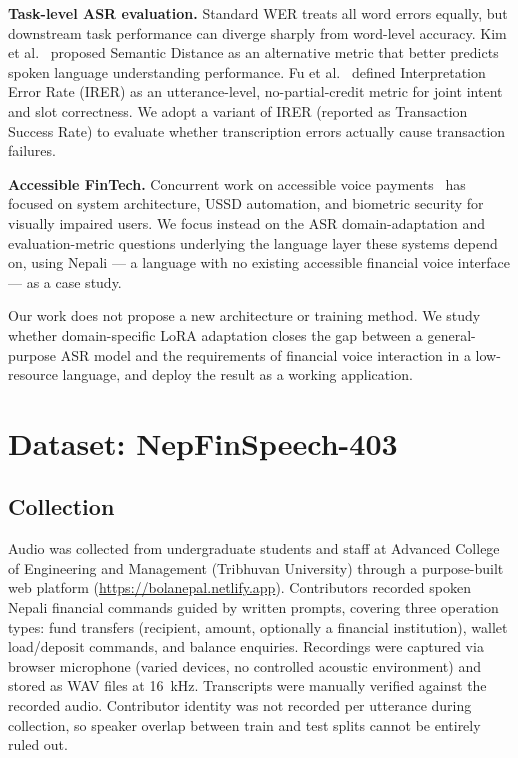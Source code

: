 \documentclass[11pt,a4paper]{article}
\begin{document}
\textbf{Task-level ASR evaluation.} Standard WER treats all word errors
equally, but downstream task performance can diverge sharply from
word-level accuracy. Kim et al.~\cite{kim2021semdist} proposed Semantic
Distance as an alternative metric that better predicts spoken language
understanding performance. Fu et al.~\cite{fu2022multitask} defined
Interpretation Error Rate (IRER) as an utterance-level, no-partial-credit
metric for joint intent and slot correctness. We adopt a variant of IRER
(reported as Transaction Success Rate) to evaluate whether transcription
errors actually cause transaction failures.

\textbf{Accessible FinTech.} Concurrent work on accessible voice
payments~\cite{accessible_mobile_money2026, voicebiometric_upi2026} has
focused on system architecture, USSD automation, and biometric security
for visually impaired users. We focus instead on the ASR
domain-adaptation and evaluation-metric questions underlying the language
layer these systems depend on, using Nepali --- a language with no
existing accessible financial voice interface --- as a case study.

Our work does not propose a new architecture or training method. We
study whether domain-specific LoRA adaptation closes the gap between a
general-purpose ASR model and the requirements of financial voice
interaction in a low-resource language, and deploy the result as a
working application.

\section{Dataset: NepFinSpeech-403}

\subsection{Collection}

Audio was collected from undergraduate students and staff at Advanced
College of Engineering and Management (Tribhuvan University) through a
purpose-built web platform
(\url{https://bolanepal.netlify.app}). Contributors
recorded spoken Nepali financial commands guided by written prompts,
covering three operation types: fund transfers (recipient, amount,
optionally a financial institution), wallet load/deposit commands, and
balance enquiries. Recordings were captured via browser microphone
(varied devices, no controlled acoustic environment) and stored as WAV
files at 16~kHz. Transcripts were manually verified against the recorded
audio. Contributor identity was not recorded per utterance during
collection, so speaker overlap between train and test splits cannot
be entirely ruled out.
\end{document}
